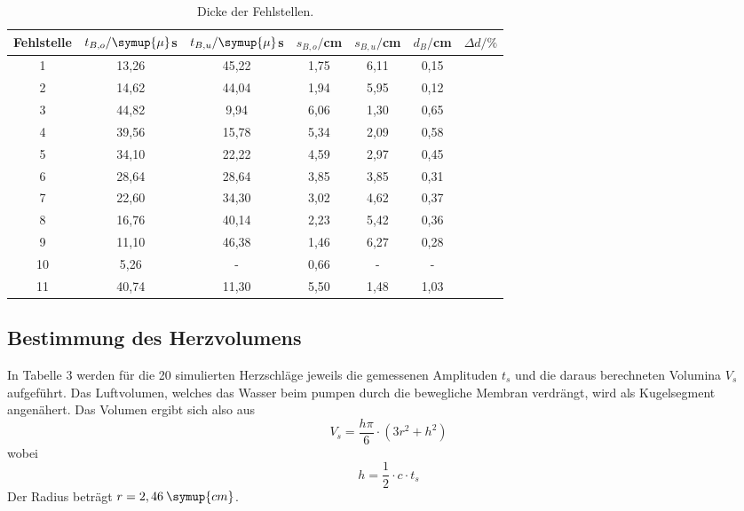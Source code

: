 \begin{table}[H]
  \centering
  \caption{Dicke der Fehlstellen.}
  \label{tab:spannung1}
  \begin{tabular}{c c c c c c c}
    \toprule
  Fehlstelle & $t_{B,o}/\symup{\mu}$s & $t_{B,u}/ \symup{\mu}$s  & $s_{B,o}/$cm & $s_{B,u}/$cm & $d_B/$cm & $\Delta d/ \%$\\
    \midrule
    1  & 13,26 &  45,22 & 1,75 & 6,11  & 0,15      \\
    2  & 14,62 &  44,04 & 1,94 & 5,95  & 0,12  \\
    3  & 44,82 &  9,94  & 6,06 & 1,30  & 0,65  \\
    4  & 39,56 &  15,78 & 5,34 & 2,09  & 0,58  \\
    5  & 34,10 &  22,22 & 4,59 & 2,97  & 0,45   \\
    6  & 28,64 &  28,64 & 3,85 & 3,85  & 0,31   \\
    7  & 22,60 &  34,30 & 3,02 & 4,62  & 0,37   \\
    8  & 16,76 &  40,14 & 2,23 & 5,42  & 0,36    \\
    9  & 11,10 &  46,38 & 1,46 & 6,27  & 0,28    \\
    10 & 5,26  &  -     &  0,66 & -    & -       \\
    11 & 40,74 &  11,30 &  5,50 & 1,48 & 1,03    \\
    \bottomrule
  \end{tabular}
\end{table}



\subsection{Bestimmung des Herzvolumens}
In Tabelle 3 werden für die 20 simulierten Herzschläge jeweils die gemessenen Amplituden $t_s$ und die daraus berechneten
Volumina $V_s$ aufgeführt. Das Luftvolumen, welches das Wasser beim pumpen durch die bewegliche Membran verdrängt, wird als
Kugelsegment angenähert. Das Volumen ergibt sich also aus
\begin{equation*}
  V_s = \frac{h\pi}{6}\cdot(3r^2 + h^2)
\end{equation*}
wobei
\begin{equation*}
  h = \frac{1}{2}\cdot c \cdot t_s
\end{equation*}
Der Radius beträgt $r = 2,46 \: \symup{cm}$.

